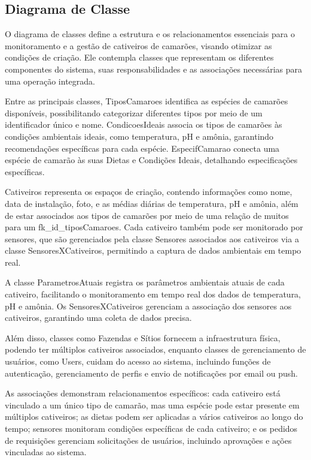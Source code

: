 \documentclass[
  a4paper,
  12pt,
  english,
  brazilian,
]{article}
\begin{document}
    \subsection*{\textbf{Diagrama de Classe}}

O diagrama de classes define a estrutura e os relacionamentos essenciais para o monitoramento e a gestão de cativeiros de camarões, visando otimizar as condições de criação. Ele contempla classes que representam os diferentes componentes do sistema, suas responsabilidades e as associações necessárias para uma operação integrada.

Entre as principais classes, TiposCamaroes identifica as espécies de camarões disponíveis, possibilitando categorizar diferentes tipos por meio de um identificador único e nome. CondicoesIdeais associa os tipos de camarões às condições ambientais ideais, como temperatura, pH e amônia, garantindo recomendações específicas para cada espécie. EspecifCamarao conecta uma espécie de camarão às suas Dietas e Condições Ideais, detalhando especificações específicas.

Cativeiros representa os espaços de criação, contendo informações como nome, data de instalação, foto, e as médias diárias de temperatura, pH e amônia, além de estar associados aos tipos de camarões por meio de uma relação de muitos para um fk\_id\_tiposCamaroes. Cada cativeiro também pode ser monitorado por sensores, que são gerenciados pela classe Sensores associados aos cativeiros via a classe SensoresXCativeiros, permitindo a captura de dados ambientais em tempo real.

A classe ParametrosAtuais registra os parâmetros ambientais atuais de cada cativeiro, facilitando o monitoramento em tempo real dos dados de temperatura, pH e amônia. Os SensoresXCativeiros gerenciam a associação dos sensores aos cativeiros, garantindo uma coleta de dados precisa.
 
Além disso, classes como Fazendas e Sítios fornecem a infraestrutura física, podendo ter múltiplos cativeiros associados, enquanto classes de gerenciamento de usuários, como Users, cuidam do acesso ao sistema, incluindo funções de autenticação, gerenciamento de perfis e envio de notificações por email ou push.

As associações demonstram relacionamentos específicos: cada cativeiro está vinculado a um único tipo de camarão, mas uma espécie pode estar presente em múltiplos cativeiros; as dietas podem ser aplicadas a vários cativeiros ao longo do tempo; sensores monitoram condições específicas de cada cativeiro; e os pedidos de requisições gerenciam solicitações de usuários, incluindo aprovações e ações vinculadas ao sistema.
\end{document}
